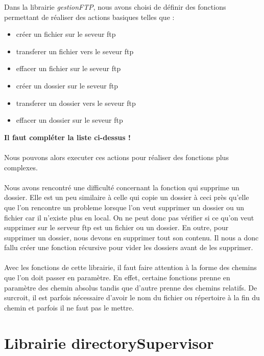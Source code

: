 Dans la librairie \textit{gestionFTP}, nous avons choisi de définir des fonctions permettant de réaliser des actions basiques telles que : 
\begin{itemize}
\item créer un fichier sur le seveur ftp
\item transferer un fichier vers le seveur ftp
\item effacer un fichier sur le seveur ftp
\item créer un dossier sur le seveur ftp
\item transferer un dossier vers le seveur ftp
\item effacer un dossier sur le seveur ftp
\end{itemize}
\textbf{Il faut compléter la liste ci-dessus !} \\
\\
Nous pouvons alors executer ces actions pour réaliser des fonctions plus complexes.\\
\\
Nous avons rencontré une difficulté concernant la fonction qui supprime un dossier. 
Elle est un peu similaire à celle qui copie un dossier à ceci près qu'elle que l'on rencontre un probleme lorsque l'on
veut supprimer un dossier ou un fichier car il n'existe plus en local. On ne peut donc pas vérifier si ce 
qu'on veut supprimer sur le serveur ftp est un fichier ou un dossier. En outre, pour supprimer un dossier, nous devons en supprimer 
tout son contenu. Il nous a donc fallu créer une fonction récursive pour vider les dossiers avant de les supprimer.\\
\\
Avec les fonctions de cette librairie, il faut faire attention à la forme des chemins que l'on doit passer en paramètre. 
En effet, certaine fonctions prenne en paramètre des chemin absolus tandis que d'autre prenne des chemins relatifs. 
De surcroit, il est parfois nécessaire d'avoir le nom du fichier ou répertoire à la fin du chemin et parfois il ne faut pas le mettre.


\section{Librairie directorySupervisor}

